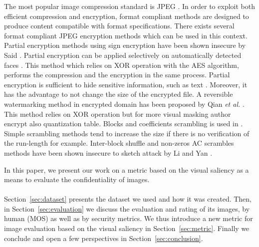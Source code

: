 \documentclass{article}
\begin{document}
The most popular image compression standard is JPEG \cite{wallace1992jpeg}. In order to exploit both efficient compression and encryption, format compliant methods are designed to produce content compatible with format specifications. There exists several format compliant JPEG encryption methods which can be used in this context. Partial encryption methods using sign encryption have been shown insecure by Said \cite{said2005measuring}. Partial encryption can be applied selectively on automatically detected faces \cite{rodrigues2006selective}. This method which relies on XOR operation with the AES algorithm, performs the compression and the encryption in the same process. Partial encryption is sufficient to hide sensitive information, such as text \cite{pinto2013protection}. Moreover, it has the advantage to not change the size of the encrypted file. A reversible watermarking method in encrypted domain has been proposed by Qian \textit{et al.} \cite{qian2014reversible}. This method relies on XOR operation but for more visual masking author encrypt also quantization table. Blocks and coefficients scrambling is used in \cite{niu2008jpeg, unterweger2012length, minemura2012jpeg, ong2015beyond}. Simple scrambling methods tend to increase the size if there is no verification of the run-length for example. Inter-block shuffle and non-zeros AC scrambles methods have been shown insecure to sketch attack by Li and Yan \cite{li2007leak}.

In this paper, we present our work on a metric based on the visual saliency as a means to evaluate the confidentiality of images.

\paragraph*{}
Section~\ref{sec:dataset} presents the dataset we used and how it was created. Then, in Section~\ref{sec:evaluation} we discuss the evaluation and rating of its images, by human (MOS) as well as by security metrics. We thus introduce a new metric for image evaluation based on the visual saliency in Section~\ref{sec:metric}. Finally we conclude and open a few perspectives in Section~\ref{sec:conclusion}.
\end{document}

